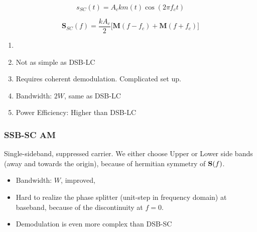 \documentclass[../../main.tex]{subfiles}
\begin{document}
\begin{equation}\label{DSB-SC time domain}
    s_{SC}(t) = A_ckm(t)\cos(2\pi f_c t)
\end{equation}

\begin{equation}\label{DSB-LC frequency domain}
    \mathbf{S}_{SC}(f) = \dfrac{kA_c}{2}\biggl[\mathbf{M}(f-f_c) + \mathbf{M}(f+f_c)\biggr]
\end{equation}

\begin{wtr}[DSB-SC AM]
\begin{enumerate}
    \item[]
    \item Not as simple as DSB-LC
    \item Requires coherent demodulation. Complicated set up.
    \item Bandwidth: $2W$, same as DSB-LC
    \item Power Efficiency: Higher than DSB-LC
\end{enumerate}
\end{wtr}

\subsubsection{SSB-SC AM}
Single-sideband, suppressed carrier. We either choose Upper or Lower side bands (away and towards the origin), because of hermitian symmetry of $\mathbf{S}(f)$.
\begin{itemize}
    \item Bandwidth: $W$, improved,
    \item Hard to realize the phase splitter (unit-step in frequency domain) at baseband, because of the discontinuity at $f=0$.
    \item Demodulation is even more complex than DSB-SC
\end{itemize}
\end{document}
